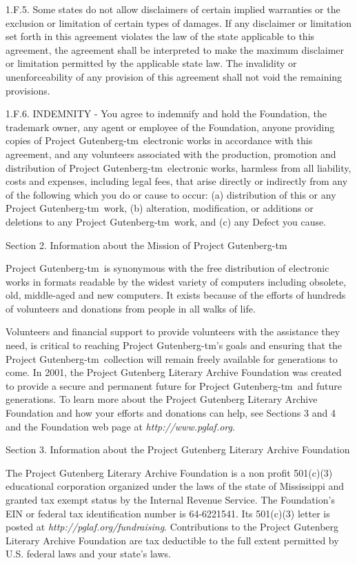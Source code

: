 \documentclass[11pt]{book}
\newcommand{\pgtm}{Project \mbox{Gutenberg-tm}}
\begin{document}
{\smallskip\noindent 1.F.5.  Some states do not allow disclaimers of certain implied
warranties or the exclusion or limitation of certain types of damages.
If any disclaimer or limitation set forth in this agreement violates the
law of the state applicable to this agreement, the agreement shall be
interpreted to make the maximum disclaimer or limitation permitted by
the applicable state law.  The invalidity or unenforceability of any
provision of this agreement shall not void the remaining provisions.

\smallskip\noindent 1.F.6.  INDEMNITY - You agree to indemnify and hold the Foundation, the
trademark owner, any agent or employee of the Foundation, anyone
providing copies of \pgtm\ electronic works in accordance
with this agreement, and any volunteers associated with the production,
promotion and distribution of \pgtm\ electronic works,
harmless from all liability, costs and expenses, including legal fees,
that arise directly or indirectly from any of the following which you do
or cause to occur: (a) distribution of this or any \pgtm\ work,
(b) alteration, modification, or additions or deletions to any
\pgtm\ work, and (c) any Defect you cause.


\medskip\noindent Section  2.  Information about the Mission of \pgtm

\smallskip\noindent \pgtm\ is synonymous with the free distribution of
electronic works in formats readable by the widest variety of computers
including obsolete, old, middle-aged and new computers.  It exists
because of the efforts of hundreds of volunteers and donations from
people in all walks of life.

\smallskip\noindent Volunteers and financial support to provide volunteers with the
assistance they need, is critical to reaching \pgtm's
goals and ensuring that the \pgtm\ collection will
remain freely available for generations to come.  In 2001, the Project
Gutenberg Literary Archive Foundation was created to provide a secure
and permanent future for \pgtm\ and future generations.
To learn more about the Project Gutenberg Literary Archive Foundation
and how your efforts and donations can help, see Sections 3 and 4
and the Foundation web page at {\em http://www.pglaf.org}.


\medskip\noindent Section 3.  Information about the Project Gutenberg Literary Archive
Foundation

\smallskip\noindent The Project Gutenberg Literary Archive Foundation is a non profit
501(c)(3) educational corporation organized under the laws of the
state of Mississippi and granted tax exempt status by the Internal
Revenue Service.  The Foundation's EIN or federal tax identification
number is 64-6221541.  Its 501(c)(3) letter is posted at
{\em http://pglaf.org/fundraising}.  Contributions to the Project Gutenberg
Literary Archive Foundation are tax deductible to the full extent
permitted by U.S. federal laws and your state's laws.

}
\end{document}
